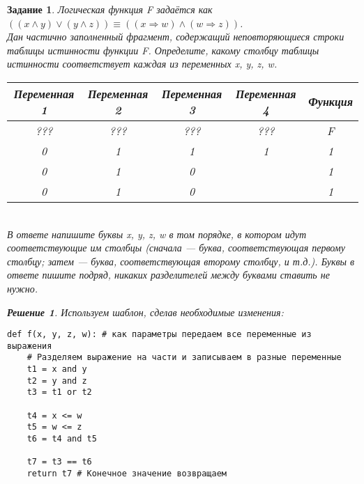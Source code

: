 \documentclass[12pt]{article}
\theoremstyle{problem_style}
\newtheorem{problem}{Задание}[subsection]
\newtheorem{solution}{Решение}[subsection]
\begin{document}
\begin{problem}
Логическая функция F задаётся как $((x \land y) \lor (y \land z)) \equiv ((x \Rightarrow w) \land (w \Rightarrow z))$.\\
Дан частично заполненный фрагмент, содержащий неповторяющиеся строки таблицы истинности функции F. Определите, какому столбцу таблицы истинности соответствует каждая из переменных x, y, z, w.
\begin{table}[h]
    \centering
    \begin{tabular}{|c|c|c|c|c|}
        \hline
        \textbf{Переменная 1} & \textbf{Переменная 2} & \textbf{Переменная 3} & \textbf{Переменная 4} & \textbf{Функция} \\
        \hline
        ??? & ??? & ??? & ??? & \textit{F} \\
        \hline
        0 & 1 & 1 & 1 & 1 \\
        \hline
        0 & 1 & 0 &  & 1 \\
        \hline
        0 & 1 & 0 &  & 1 \\
        \hline
    \end{tabular}
\end{table}\\
В ответе напишите буквы x, y, z, w в том порядке, в котором идут соответствующие им столбцы (сначала — буква, соответствующая первому столбцу; затем — буква, соответствующая второму столбцу, и т.д.). Буквы в ответе пишите подряд, никаких разделителей между буквами ставить не нужно.
\begin{solution}
Используем шаблон, сделав необходимые изменения:
\begin{verbatim}
def f(x, y, z, w): # как параметры передаем все переменные из выражения
    # Разделяем выражение на части и записываем в разные переменные
    t1 = x and y
    t2 = y and z
    t3 = t1 or t2

    t4 = x <= w
    t5 = w <= z
    t6 = t4 and t5

    t7 = t3 == t6
    return t7 # Конечное значение возвращаем


\end{verbatim}
\end{solution}
\end{problem}
\end{document}
